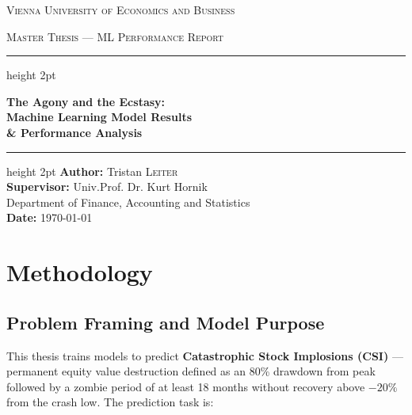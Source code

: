 \documentclass{report}\usepackage[]{graphicx}\usepackage[table]{xcolor}
\begin{document}



\begin{titlepage}
    \centering
    {\scshape\LARGE Vienna University of Economics and Business \par}
    \vspace{1cm}
    {\scshape\Large Master Thesis — ML Performance Report \par}
    \vspace{2.5cm}
    \hrule height 2pt
    \vspace{0.5cm}
    {\huge \bfseries The Agony and the Ecstasy: \\[0.3cm]
     Machine Learning Model Results \\[0.2cm]
     \& Performance Analysis \par}
    \vspace{0.5cm}
    \hrule height 2pt
    \vspace{2cm}
    \Large \textbf{Author:} Tristan \textsc{Leiter} \\
    \vspace{1cm}
    \normalsize \textbf{Supervisor:} Univ.Prof. Dr. Kurt Hornik \\
    Department of Finance, Accounting and Statistics \\
    \vspace{1cm}
    \textbf{Date:} \today
    \vfill
\end{titlepage}
\restoregeometry

\tableofcontents
\newpage

\chapter{Methodology}
\label{ch:methodology}

\section{Problem Framing and Model Purpose}

This thesis trains models to predict \textbf{Catastrophic Stock Implosions (CSI)} — permanent 
equity value destruction defined as an 80\% drawdown from peak followed by a zombie period of 
at least 18 months without recovery above $-20\%$ from the crash low. The prediction task is:
\end{document}
